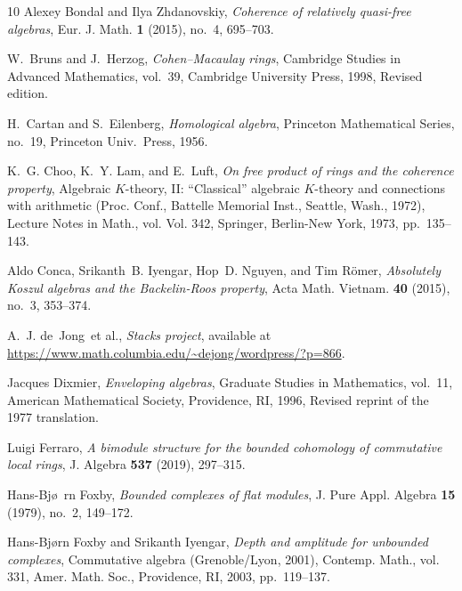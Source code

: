 \documentclass{amsart}
\numberwithin{equation}{section}
\theoremstyle{plain}
\theoremstyle{definition}
\theoremstyle{remark}
\begin{document}
\begin{thebibliography}{10}
Alexey Bondal and Ilya Zhdanovskiy, \emph{Coherence of relatively quasi-free
  algebras}, Eur. J. Math. \textbf{1} (2015), no.~4, 695--703. 

W.~Bruns and J.~Herzog, \emph{{Cohen--Macaulay rings}}, Cambridge Studies in
  Advanced Mathematics, vol.~39, Cambridge University Press, 1998, Revised
  edition.

H.~Cartan and S.~Eilenberg, \emph{{Homological algebra}}, Princeton
  Mathematical Series, no.~19, Princeton Univ.\ Press, 1956.

K.~G. Choo, K.~Y. Lam, and E.~Luft, \emph{On free product of rings and the
  coherence property}, Algebraic {$K$}-theory, {II}: ``{C}lassical'' algebraic
  {$K$}-theory and connections with arithmetic ({P}roc. {C}onf., {B}attelle
  {M}emorial {I}nst., {S}eattle, {W}ash., 1972), Lecture Notes in Math., vol.
  Vol. 342, Springer, Berlin-New York, 1973, pp.~135--143. 

Aldo Conca, Srikanth~B. Iyengar, Hop~D. Nguyen, and Tim R\"{o}mer,
  \emph{Absolutely {K}oszul algebras and the {B}ackelin-{R}oos property}, Acta
  Math. Vietnam. \textbf{40} (2015), no.~3, 353--374. 

A.~J. de~Jong~et al., \emph{{Stacks project}}, available at\newline
  \url{https://www.math.columbia.edu/~dejong/wordpress/?p=866}.

Jacques Dixmier, \emph{Enveloping algebras}, Graduate Studies in Mathematics,
  vol.~11, American Mathematical Society, Providence, RI, 1996, Revised reprint
  of the 1977 translation. 

Luigi Ferraro, \emph{A bimodule structure for the bounded cohomology of
  commutative local rings}, J. Algebra \textbf{537} (2019), 297--315.

Hans-Bj\o~rn Foxby, \emph{Bounded complexes of flat modules}, J. Pure Appl.
  Algebra \textbf{15} (1979), no.~2, 149--172. 

Hans-Bj{\o}rn Foxby and Srikanth Iyengar, \emph{Depth and amplitude for
  unbounded complexes}, Commutative algebra ({G}renoble/{L}yon, 2001), Contemp.
  Math., vol. 331, Amer. Math. Soc., Providence, RI, 2003, pp.~119--137.


\end{thebibliography}
\end{document}
